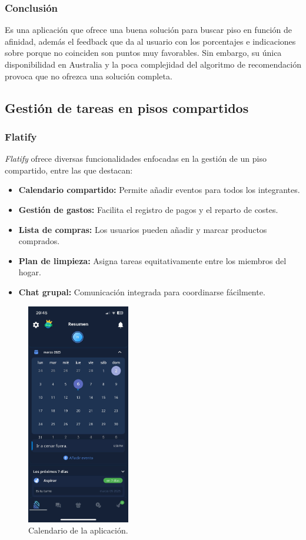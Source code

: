 \subsubsection*{Conclusión}
Es una aplicación que ofrece una buena solución para buscar piso en función de afinidad, además el feedback que da al usuario con los porcentajes  e indicaciones sobre porque no coinciden son puntos muy favorables. Sin embargo, su única disponibilidad en Australia y la poca complejidad del algoritmo de recomendación provoca que no ofrezca una solución completa.

\subsection{Gestión de tareas en pisos compartidos}

\subsubsection{Flatify}
\emph{Flatify} \cite{Flatify} ofrece diversas funcionalidades enfocadas en la gestión de un piso compartido, entre las que destacan:
\begin{itemize}
    \item \textbf{Calendario compartido:} Permite añadir eventos para todos los integrantes.
    \item \textbf{Gestión de gastos:} Facilita el registro de pagos y el reparto de costes.
    \item \textbf{Lista de compras:} Los usuarios pueden añadir y marcar productos comprados.
    \item \textbf{Plan de limpieza:} Asigna tareas equitativamente entre los miembros del hogar.
    \item \textbf{Chat grupal:} Comunicación integrada para coordinarse fácilmente.
\end{itemize}

\begin{figure}[H]
    \centering
    \includegraphics[width=0.4\textwidth]{fotos/Home-flatify.jpeg}
    \caption{Calendario de la aplicación\textbf{}.}
\end{figure}
\newpage

